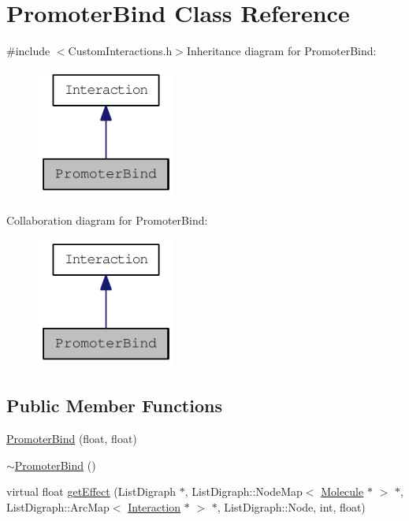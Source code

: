 \hypertarget{classPromoterBind}{
\section{PromoterBind Class Reference}
\label{classPromoterBind}
}


{\ttfamily \#include $<$CustomInteractions.h$>$}Inheritance diagram for PromoterBind:\nopagebreak
\begin{figure}[H]
\begin{center}
\leavevmode
\includegraphics[width=130pt]{classPromoterBind__inherit__graph}
\end{center}
\end{figure}
Collaboration diagram for PromoterBind:\nopagebreak
\begin{figure}[H]
\begin{center}
\leavevmode
\includegraphics[width=130pt]{classPromoterBind__coll__graph}
\end{center}
\end{figure}
\subsection*{Public Member Functions}
\begin{DoxyCompactItemize}
\item 
\hyperlink{classPromoterBind_a9b26e7c71c89dd80a4943d42d82bee6e}{PromoterBind} (float, float)
\item 
\hyperlink{classPromoterBind_af6e1a9353873574965b23cc4b02b0ac2}{$\sim$PromoterBind} ()
\item 
virtual float \hyperlink{classPromoterBind_afadb621f9976cc52d83caec0e8613244}{getEffect} (ListDigraph $\ast$, ListDigraph::NodeMap$<$ \hyperlink{classMolecule}{Molecule} $\ast$ $>$ $\ast$, ListDigraph::ArcMap$<$ \hyperlink{classInteraction}{Interaction} $\ast$ $>$ $\ast$, ListDigraph::Node, int, float)
\end{DoxyCompactItemize}
